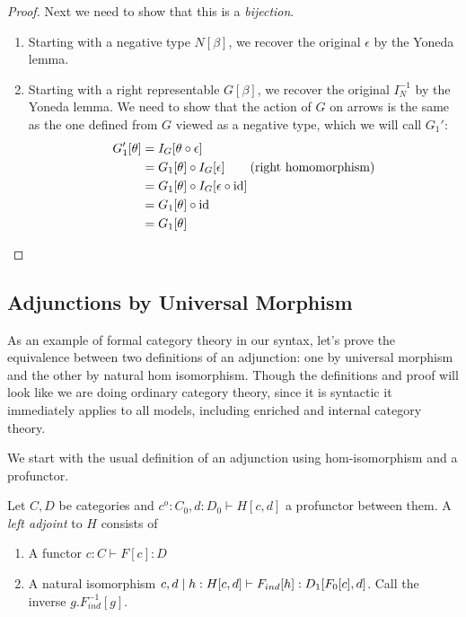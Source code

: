 \documentclass{article}
\begin{document}
\begin{proof}
  Next we need to show that this is a \emph{bijection}.
  \begin{enumerate}
  \item Starting with a negative type $N[\beta]$, we recover the
    original $\epsilon$ by the Yoneda lemma.
  \item Starting with a right representable $G[\beta]$, we recover the
    original $I_N^{-1}$ by the Yoneda lemma. We need to show that the
    action of $G$ on arrows is the same as the one defined from $G$
    viewed as a negative type, which we will call $G_1'$:
    \begin{align*}
      G_1'[\theta] &= I_G[\theta \circ \epsilon]\\
      &= G_1[\theta] \circ I_G[\epsilon]\tag{right homomorphism}\\
      &= G_1[\theta] \circ I_G[\epsilon \circ \textrm{id}]\\
      &= G_1[\theta] \circ \textrm{id}\\
      &= G_1[\theta]
    \end{align*}
  \end{enumerate}
\end{proof}

\subsection{Adjunctions by Universal Morphism}

As an example of formal category theory in our syntax, let's prove the
equivalence between two definitions of an adjunction: one by universal
morphism and the other by natural hom isomorphism.
%
Though the definitions and proof will look like we are doing ordinary
category theory, since it is syntactic it immediately applies to all
models, including enriched and internal category theory.

We start with the usual definition of an adjunction using
hom-isomorphism and a profunctor.
\begin{definition}
  Let $C,D$ be categories and $c^o:C_0,d:D_0 \vdash H[c,d]$ a
  profunctor between them. A \emph{left adjoint} to $H$ consists of
  \begin{enumerate}
  \item A functor $c:C \vdash F[c] : D$
  \item A natural isomorphism $c,d \mathrel{|} h : H[c,d] \vdash
    F_{ind}[h]: D_1[F_0[c],d]$. Call the inverse $g. F_{ind}^{-1}[g]$.
  \end{enumerate}
\end{definition}
\end{document}
